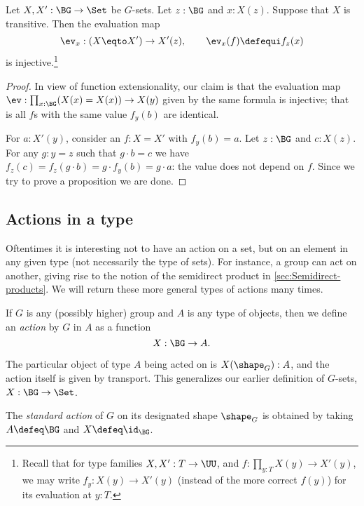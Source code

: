 \begin{lemma}
  \label{lem:evisinjwhentransitive}
  Let $X,X':\BG\to\Set$ be $G$-sets. Let $z:\BG$ and $x:X(z)$. Suppose that $X$
  is transitive. Then the evaluation map
  \[
    \ev_x:(X \eqto X')\to X'(z),\qquad \ev_x(f)\defequi f_z(x)
  \]
  is injective.\footnote{%
    Recall that for type families $X,X':T\to\UU$, and
    $f:\prod_{y:T}X(y)\to X'(y)$, we may write $f_y:X(y)\to X'(y)$ (instead of
    the more correct $f(y)$) for its evaluation at $y:T$.}
\end{lemma}
\begin{proof}
  In view of function extensionality, our claim is that the evaluation
  map $\ev:\prod_{x:\BG}(X(x)=X(x))\to X(y)$ given by the same formula
  is injective; that is all $f$s with the same value $f_y(b)$ are
  identical.

  For $a:X'(y)$, consider an $f:X=X'$ with $f_y(b)=a$. Let $z:\BG$ and
  $c:X(z)$.  For any $g:y=z$ such that $g\cdot b=c$ we have
  $f_z(c)=f_z(g\cdot b)=g \cdot f_y(b)=g \cdot a$: the value does not
  depend on $f$. Since we try to prove a proposition we are done.
\end{proof}

\subsection{Actions in a type}
\label{sec:actions}
Oftentimes it is interesting not to have an action on a set, but on an element in any given type (not necessarily the type of sets).  For instance, a group can act on another, giving rise to the notion of the semidirect product in \cref{sec:Semidirect-products}.  We will return these more general types of actions many times.

\begin{definition}\label{action}
  If $G$ is any (possibly higher) group and $A$ is any type of objects,
  then we define an \emph{action} by $G$ in %
  $A$ as a function
  \[
    X : \BG \to A.\qedhere
  \]
\end{definition}

The particular object of type $A$ being acted on is $X(\shape_G):A$,
and the action itself is given by transport.
This generalizes our earlier definition of $G$-sets, $X : \BG \to \Set$.

\begin{definition}\label{std-action}
  The \emph{standard action} of $G$ on its designated shape $\shape_G$ is obtained by
  taking $A \defeq \BG$ and $X \defeq \id_{\BG}$.
\end{definition}

